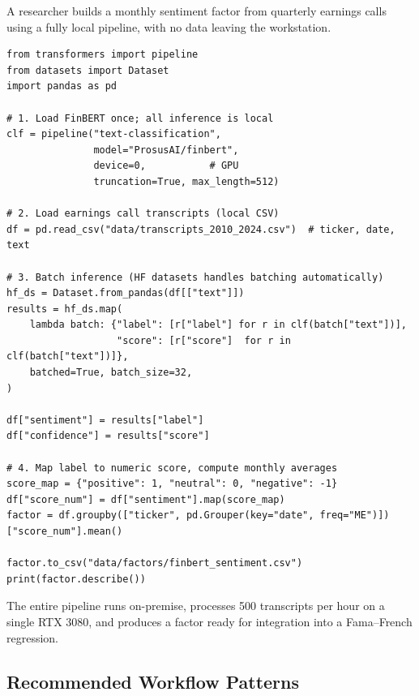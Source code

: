 \begin{example}
\label{ex:hf-sentiment}
A researcher builds a monthly sentiment factor from quarterly earnings calls
using a fully local pipeline, with no data leaving the workstation.

\begin{verbatim}
from transformers import pipeline
from datasets import Dataset
import pandas as pd

# 1. Load FinBERT once; all inference is local
clf = pipeline("text-classification",
               model="ProsusAI/finbert",
               device=0,           # GPU
               truncation=True, max_length=512)

# 2. Load earnings call transcripts (local CSV)
df = pd.read_csv("data/transcripts_2010_2024.csv")  # ticker, date, text

# 3. Batch inference (HF datasets handles batching automatically)
hf_ds = Dataset.from_pandas(df[["text"]])
results = hf_ds.map(
    lambda batch: {"label": [r["label"] for r in clf(batch["text"])],
                   "score": [r["score"]  for r in clf(batch["text"])]},
    batched=True, batch_size=32,
)

df["sentiment"] = results["label"]
df["confidence"] = results["score"]

# 4. Map label to numeric score, compute monthly averages
score_map = {"positive": 1, "neutral": 0, "negative": -1}
df["score_num"] = df["sentiment"].map(score_map)
factor = df.groupby(["ticker", pd.Grouper(key="date", freq="ME")])["score_num"].mean()

factor.to_csv("data/factors/finbert_sentiment.csv")
print(factor.describe())
\end{verbatim}

The entire pipeline runs on-premise, processes 500 transcripts per hour on
a single RTX 3080, and produces a factor ready for integration into a
Fama--French regression.
\end{example}

\subsection{Recommended Workflow Patterns}
\label{app:hf:patterns}


